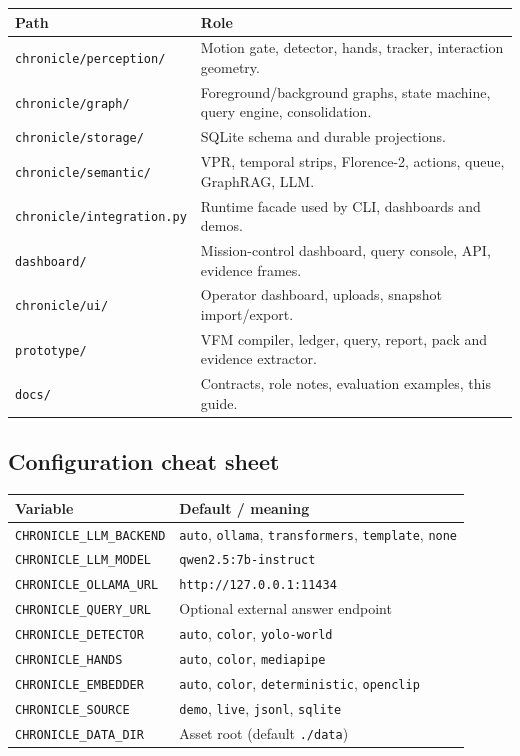 \documentclass[10pt,a4paper]{article}
\newcommand{\code}[1]{\texttt{\small #1}}
\begin{document}
\begin{center}
\small
\begin{tabularx}{\linewidth}{@{}l L@{}}
\toprule
\textbf{Path} & \textbf{Role} \\
\midrule
\code{chronicle/perception/} & Motion gate, detector, hands, tracker, interaction geometry. \\
\code{chronicle/graph/} & Foreground/background graphs, state machine, query engine, consolidation. \\
\code{chronicle/storage/} & SQLite schema and durable projections. \\
\code{chronicle/semantic/} & VPR, temporal strips, Florence-2, actions, queue, GraphRAG, LLM. \\
\code{chronicle/integration.py} & Runtime facade used by CLI, dashboards and demos. \\
\code{dashboard/} & Mission-control dashboard, query console, API, evidence frames. \\
\code{chronicle/ui/} & Operator dashboard, uploads, snapshot import/export. \\
\code{prototype/} & VFM compiler, ledger, query, report, pack and evidence extractor. \\
\code{docs/} & Contracts, role notes, evaluation examples, this guide. \\
\bottomrule
\end{tabularx}
\end{center}

\subsection*{Configuration cheat sheet}

\begin{center}
\small
\begin{tabularx}{\linewidth}{@{}l L@{}}
\toprule
\textbf{Variable} & \textbf{Default / meaning} \\
\midrule
\code{CHRONICLE\_LLM\_BACKEND} & \code{auto}, \code{ollama}, \code{transformers}, \code{template}, \code{none} \\
\code{CHRONICLE\_LLM\_MODEL} & \code{qwen2.5:7b-instruct} \\
\code{CHRONICLE\_OLLAMA\_URL} & \code{http://127.0.0.1:11434} \\
\code{CHRONICLE\_QUERY\_URL} & Optional external answer endpoint \\
\code{CHRONICLE\_DETECTOR} & \code{auto}, \code{color}, \code{yolo-world} \\
\code{CHRONICLE\_HANDS} & \code{auto}, \code{color}, \code{mediapipe} \\
\code{CHRONICLE\_EMBEDDER} & \code{auto}, \code{color}, \code{deterministic}, \code{openclip} \\
\code{CHRONICLE\_SOURCE} & \code{demo}, \code{live}, \code{jsonl}, \code{sqlite} \\
\code{CHRONICLE\_DATA\_DIR} & Asset root (default \code{./data}) \\
\bottomrule
\end{tabularx}
\end{center}
\end{document}

